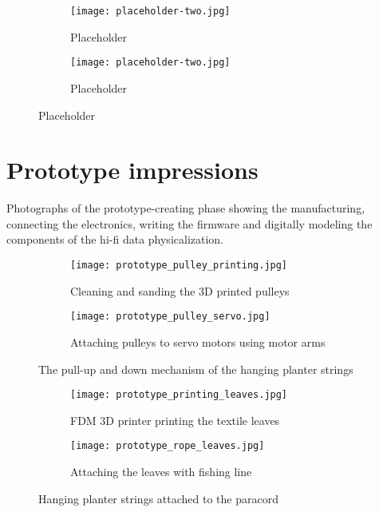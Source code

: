 \begin{appendices}
\begin{figure}[htbp]
    \centering
    \begin{subfigure}{0.48\textwidth}
        \centering
        \texttt{[image: placeholder-two.jpg]}
        \caption{Placeholder}
        \label{fig:image1}
    \end{subfigure}
    \hfill
    \begin{subfigure}{0.48\textwidth}
        \centering
        \texttt{[image: placeholder-two.jpg]}
        \caption{Placeholder}
        \label{fig:image2}
    \end{subfigure}
    \caption{Placeholder}
    \label{fig:grid}
\end{figure}

\section{Prototype impressions}
\label{appendix:prototype}

Photographs of the prototype-creating phase showing the manufacturing, connecting the electronics, writing the firmware and digitally modeling the components of the hi-fi data physicalization. 

\begin{figure}[htbp]
    \centering
    \begin{subfigure}{0.48\textwidth}
        \centering
        \texttt{[image: prototype\_pulley\_printing.jpg]}
        \caption{Cleaning and sanding the 3D printed pulleys}
        \label{fig:image1}
    \end{subfigure}
    \hfill
    \begin{subfigure}{0.48\textwidth}
        \centering
        \texttt{[image: prototype\_pulley\_servo.jpg]}
        \caption{Attaching pulleys to servo motors using motor arms}
        \label{fig:image2}
    \end{subfigure}
    \caption{The pull-up and down mechanism of the hanging planter strings}
    \label{fig:grid}
\end{figure}

\begin{figure}[htbp]
    \centering
    \begin{subfigure}{0.48\textwidth}
        \centering
        \texttt{[image: prototype\_printing\_leaves.jpg]}
        \caption{FDM 3D printer printing the textile leaves}
        \label{fig:image1}
    \end{subfigure}
    \hfill
    \begin{subfigure}{0.48\textwidth}
        \centering
        \texttt{[image: prototype\_rope\_leaves.jpg]}
        \caption{Attaching the leaves with fishing line }
        \label{fig:image2}
    \end{subfigure}
    \caption{Hanging planter strings attached to the paracord}
    \label{fig:grid}
\end{figure}


\end{appendices}
